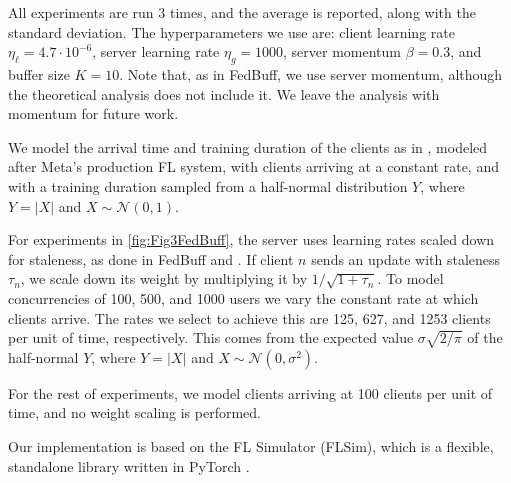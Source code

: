 All experiments are run 3 times, and the average is reported, along with the standard deviation.
The hyperparameters we use are: client learning rate $\eta_\ell = 4.7 \cdot 10^{-6}$, server learning rate $\eta_g = 1000$, server momentum $\beta = 0.3$, and buffer size $K = 10$.
Note that, as in FedBuff, we use server momentum, although the theoretical analysis does not include it.
We leave the analysis with momentum for future work.

We model the arrival time and training duration of the clients as in \cite{FedBuff}, modeled after Meta's production FL system, with clients arriving at a constant rate, and with a training duration sampled from a half-normal distribution $Y$, where $Y = |X|$ and $X \sim \mathcal{N}(0,1)$.

For experiments in \cref{fig:Fig3FedBuff}, the server uses learning rates scaled down for staleness, as done in FedBuff and \cite{asyncfl}.
If client $n$ sends an update with staleness $\tau_n$, we scale down its weight by multiplying it by $1/\sqrt{1+\tau_n}$.
To model concurrencies of 100, 500, and 1000 users we vary the constant rate at which clients arrive.
The rates we select to achieve this are 125, 627, and 1253 clients per unit of time, respectively.
This comes from the expected value $\sigma \sqrt{2/\pi}$ of the half-normal $Y$, where $Y = |X|$ and $X \sim \mathcal{N}(0,\sigma^2)$.

For the rest of experiments, we model clients arriving at 100 clients per unit of time, and no weight scaling is performed.

Our implementation is based on the FL Simulator (FLSim), which is a flexible, standalone library written in PyTorch \cite{flsim,pytorch}.

